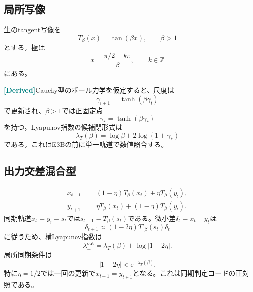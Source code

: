 \documentclass[a4paper,11pt,oneside,openany]{ltjsbook}
\newcommand{\e}{\mathrm{e}}
\newcommand{\Derived}{\textcolor{Teal}{\sffamily\bfseries [Derived]}}
\begin{document}
\subsection{局所写像}

生のtangent写像を
\begin{equation}
  T_\beta(x)=\tan(\beta x),
  \qquad \beta>1
  \label{eq:raw_tangent_map}
\end{equation}
とする。極は
\begin{equation}
  x=\frac{\pi/2+k\pi}{\beta},
  \qquad k\in\mathbb Z
  \label{eq:tangent_poles}
\end{equation}
にある。

\Derived Cauchy型のポール力学を仮定すると、尺度は
\begin{equation}
  \gamma_{t+1}=\tanh(\beta\gamma_t)
  \label{eq:tangent_scale_map}
\end{equation}
で更新され、\(\beta>1\)では正固定点
\begin{equation}
  \gamma_*=\tanh(\beta\gamma_*)
  \label{eq:tangent_gamma_fixed}
\end{equation}
を持つ。Lyapunov指数の候補閉形式は
\begin{equation}
  \lambda_T(\beta)
  =\log\beta+2\log(1+\gamma_*)
  \label{eq:tangent_lyap}
\end{equation}
である。これはE3Bの前に単一軌道で数値照合する。

\subsection{出力交差混合型}

\begin{align}
  x_{t+1}&=(1-\eta)T_\beta(x_t)+\eta T_\beta(y_t),\\
  y_{t+1}&=\eta T_\beta(x_t)+(1-\eta)T_\beta(y_t).
  \label{eq:output_cross_tangent}
\end{align}
同期軌道\(x_t=y_t=s_t\)では\(s_{t+1}=T_\beta(s_t)\)である。微小差\(\delta_t=x_t-y_t\)は
\begin{equation}
  \delta_{t+1}
  \approx(1-2\eta)T'_\beta(s_t)\delta_t
  \label{eq:output_cross_variational}
\end{equation}
に従うため、横Lyapunov指数は
\begin{equation}
  \lambda_\perp^{\mathrm{out}}
  =\lambda_T(\beta)+\log|1-2\eta|.
  \label{eq:output_cross_transverse}
\end{equation}
局所同期条件は
\begin{equation}
  |1-2\eta|<\e^{-\lambda_T(\beta)}.
  \label{eq:output_cross_interval}
\end{equation}
特に\(\eta=1/2\)では一回の更新で\(x_{t+1}=y_{t+1}\)となる。これは同期判定コードの正対照である。
\end{document}
